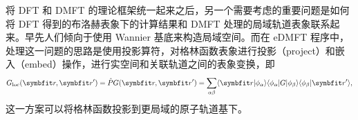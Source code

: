 将 DFT 和 DMFT 的理论框架统一起来之后，另一个需要考虑的重要问题是如何将 DFT 得到的布洛赫表象下的计算结果和 DMFT 处理的局域轨道表象联系起来。早先人们倾向于使用 Wannier 基底来构造局域空间。而在 eDMFT 程序中，处理这一问题的思路是使用投影算符，对格林函数表象进行投影（project）和嵌入（embed）操作，进行实空间和关联轨道之间的表象变换，即 
\begin{equation}
    G_{\fun{loc}}(\vct{r},\vct{r}')=\hat{P}G(\vct{r},\vct{r}')=\sum_{\alpha\beta}\lag\vct{r}|\phi_\alpha\rag\lag\phi_{\alpha}|G|\phi_{\beta}\rag\lag\phi_\beta|\vct{r}'\rag,
\end{equation}
这一方案可以将格林函数投影到更局域的原子轨道基下\cite{PhysRevB.90.075136}。